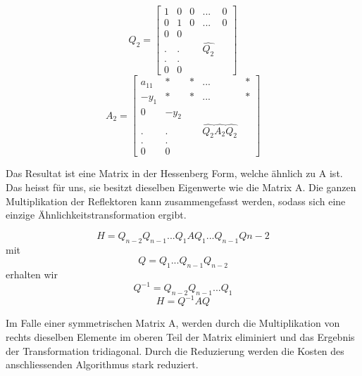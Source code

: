 \begin{equation}
	Q_{2}=
	\begin{bmatrix}
	1 & 0 & 0 & ... & 0\\
	0 & 1 & 0 & ... & 0\\
	0 & 0 &\\
	. & . & &\hat{Q_2} &\\
	. & . &\\
	0 & 0 &
	\end{bmatrix}
\end{equation}	
\begin{equation}
	A_{2}=
	\begin{bmatrix}
	a_{11} & * & * & ... & *\\
	-y_{1} & * & * & ... & *\\
	0 & -y_{2} &\\
	. & . & &\hat{Q_2}\hat{A_{2}}\hat{Q_2} &\\
	. & . &\\
	0 & 0 &
	\end{bmatrix}
\end{equation}

Das Resultat ist eine Matrix in der Hessenberg Form, welche ähnlich zu A ist.
Das heisst für uns, sie besitzt dieselben Eigenwerte wie die Matrix A.
Die ganzen Multiplikation der Reflektoren kann zusammengefasst werden, sodass sich eine einzige Ähnlichkeitstransformation ergibt.

\begin{equation}
	H=Q_{n-2}Q_{n-1}...Q_{1}AQ_{1}...Q_{n-1}Q{n-2}
\end{equation}
mit 
\begin{equation}
	Q=Q_{1}...Q_{n-1}Q_{n-2}
\end{equation}
erhalten wir
\begin{equation}
	Q^{-1} = Q_{n-2}Q_{n-1}...Q_{1}
\end{equation}
\begin{equation}
H=Q^{-1}AQ
\end{equation}

Im Falle einer symmetrischen Matrix A, werden durch die Multiplikation von rechts dieselben Elemente im oberen Teil der Matrix eliminiert und das Ergebnis der Transformation tridiagonal.
Durch die Reduzierung werden die Kosten des anschliessenden Algorithmus stark reduziert.
